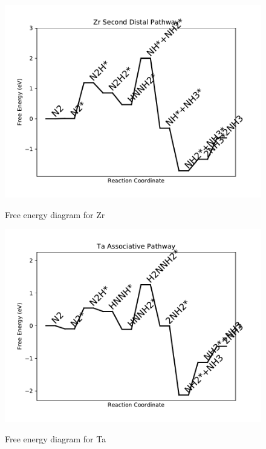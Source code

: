 \documentclass{article}
\begin{document}
\newpage
\begin{figure}
\includegraphics[width=1\linewidth]{data/plots/Zr_distal_2.pdf}
\label{fig:Zr_distal_2}
\caption{Free energy diagram for Zr}
\end{figure}

\begin{figure}
\includegraphics[width=1\linewidth]{data/plots/Ta_associative.pdf}
\label{fig:Ta_associative}
\caption{Free energy diagram for Ta}
\end{figure}
\end{document}
